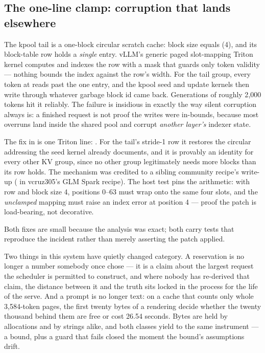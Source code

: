\subsection{The one-line clamp: corruption that lands elsewhere}

The kpool tail is a one-block circular scratch cache: block size equals
 (4), and its block-table row holds a \emph{single} entry.
vLLM's generic paged slot-mapping Triton kernel computes
 and indexes the row with a mask that
guards only token validity --- nothing bounds the index against the row's
width. For the tail group, every token at  reads past
the one entry, and the kpool seed and update kernels then write through
whatever garbage block id came back. Generations of roughly 2{,}000 tokens
hit it reliably. The failure is insidious in exactly the way silent
corruption always is: a finished request is not proof the writes were
in-bounds, because most overruns land inside the shared pool and corrupt
\emph{another layer's} indexer state.

The fix in
 is one Triton line:
. For the
tail's stride-1 row it restores the circular addressing the seed kernel
already documents, and it is provably an identity for every other KV group,
since no other group legitimately needs more blocks than its row holds. The
mechanism was credited to a sibling community recipe's write-up
( in vcruz305's GLM Spark recipe). The
host test pins the arithmetic: with row \code{[17]} and block size 4,
positions 0--63 must wrap onto the same four slots, and the \emph{unclamped}
mapping must raise an index error at position 4 --- proof the patch is load-bearing, not decorative.

\begin{hbnote}
Both fixes are small because the analysis was exact; both carry tests that
reproduce the incident rather than merely asserting the patch applied.
\end{hbnote}

\FloatBarrier

Two things in this system have quietly changed category. A reservation is
no longer a number somebody once chose --- it is a claim about the largest
request the scheduler is permitted to construct, and where nobody has
re-derived that claim, the distance between it and the truth sits locked in
the process for the life of the serve. And a prompt is no longer text: on a
cache that counts only whole 3{,}584-token pages, the first twenty bytes of
a rendering decide whether the twenty thousand behind them are free or cost
26.54 seconds. Bytes are held by allocations and by strings alike, and both
classes yield to the same instrument --- a bound, plus a guard that fails
closed the moment the bound's assumptions drift.

